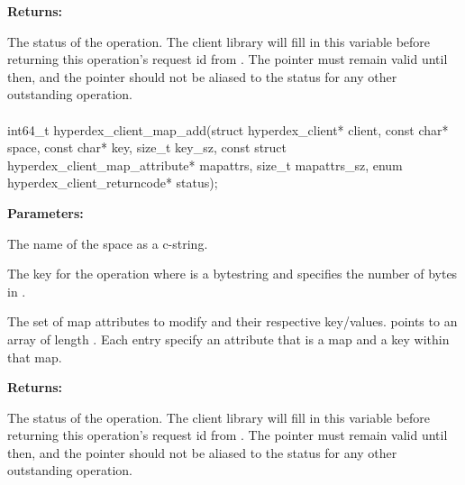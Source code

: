 \noindent\textbf{Returns:}
\begin{description}[labelindent=\widthof{{\code{status}}},leftmargin=*,noitemsep,nolistsep,align=right]
\item[\code{status}] The status of the operation.  The client library will fill in this variable before returning this operation's request id from .  The pointer must remain valid until then, and the pointer should not be aliased to the status for any other outstanding operation.
\end{description}

\paragraph{}
\label{api:c:map_add}
\begin{ccode}
int64_t hyperdex_client_map_add(struct hyperdex_client* client,
                const char* space,
                const char* key, size_t key_sz,
                const struct hyperdex_client_map_attribute* mapattrs, size_t mapattrs_sz,
                enum hyperdex_client_returncode* status);
\end{ccode}
\funcdesc 

\noindent\textbf{Parameters:}
\begin{description}[labelindent=\widthof{{\code{mapattrs}, \code{mapattrs\_sz}}},leftmargin=*,noitemsep,nolistsep,align=right]
\item[\code{space}] The name of the space as a c-string.
\item[\code{key}, \code{key\_sz}] The key for the operation where  is a bytestring and  specifies the number of bytes in .
\item[\code{mapattrs}, \code{mapattrs\_sz}] The set of map attributes to modify and their respective key/values.   points to an array of length .  Each entry specify an attribute that is a map and a key within that map.
\end{description}

\noindent\textbf{Returns:}
\begin{description}[labelindent=\widthof{{\code{status}}},leftmargin=*,noitemsep,nolistsep,align=right]
\item[\code{status}] The status of the operation.  The client library will fill in this variable before returning this operation's request id from .  The pointer must remain valid until then, and the pointer should not be aliased to the status for any other outstanding operation.
\end{description}

